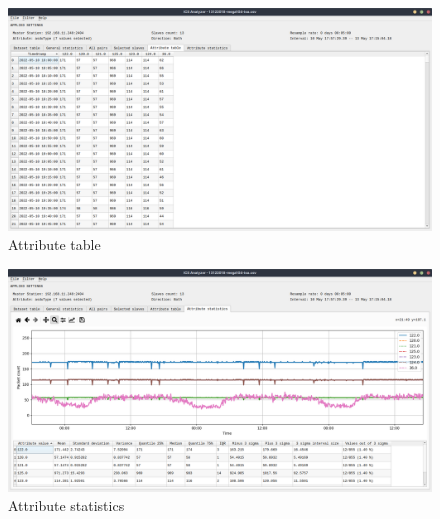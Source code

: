     \begin{figure}[H]
    	\centering
    	\includegraphics[width=1\textwidth]{obrazky-figures/tabs/tab5.png}
    	\caption{Attribute table}
    	\label{fig:tab5}
    \end{figure}
    
    
    \begin{figure}[H]
    	\centering
    	\includegraphics[width=1\textwidth]{obrazky-figures/tabs/tab6.png}
    	\caption{Attribute statistics}
    	\label{fig:tab6}
    \end{figure}



    
